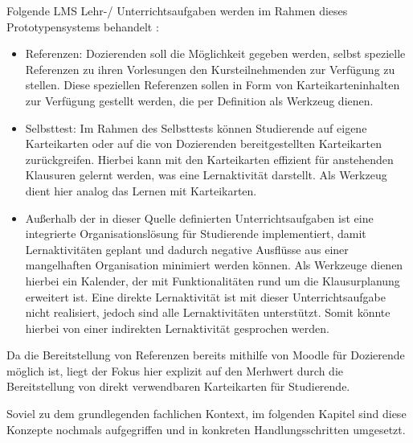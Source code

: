 Folgende \ac{LMS} Lehr-/ Unterrichtsaufgaben werden im Rahmen dieses Prototypensystems behandelt \autocite[S.248]{SCHOONENBOOM2014247}:
\begin{itemize}
	\item Referenzen: Dozierenden soll die Möglichkeit gegeben werden, selbst spezielle Referenzen zu ihren Vorlesungen den Kursteilnehmenden zur Verfügung zu stellen. Diese speziellen Referenzen sollen in Form von Karteikarteninhalten zur Verfügung gestellt werden, die per Definition als Werkzeug dienen.
	\item Selbsttest: Im Rahmen des Selbsttests können Studierende auf eigene Karteikarten oder auf die von Dozierenden bereitgestellten Karteikarten zurückgreifen. Hierbei kann mit den Karteikarten effizient für anstehenden Klausuren gelernt werden, was eine Lernaktivität darstellt. Als Werkzeug dient hier analog das Lernen mit Karteikarten.
	\item Außerhalb der in dieser Quelle definierten Unterrichtsaufgaben ist eine integrierte Organisationslösung für Studierende implementiert, damit Lernaktivitäten geplant und dadurch negative Ausflüsse aus einer mangelhaften Organisation minimiert werden können.	Als Werkzeuge dienen hierbei ein Kalender, der mit Funktionalitäten rund um die Klausurplanung erweitert ist. Eine direkte Lernaktivität ist mit dieser Unterrichtsaufgabe nicht realisiert, jedoch sind alle Lernaktivitäten unterstützt. Somit könnte hierbei von einer indirekten Lernaktivität gesprochen werden.
\end{itemize}

Da die Bereitstellung von Referenzen bereits mithilfe von Moodle für Dozierende möglich ist, liegt der Fokus hier explizit auf den Merhwert durch die Bereitstellung von direkt verwendbaren Karteikarten für Studierende.

Soviel zu dem grundlegenden fachlichen Kontext, im folgenden Kapitel sind diese Konzepte nochmals aufgegriffen und in konkreten Handlungsschritten umgesetzt. 

%


